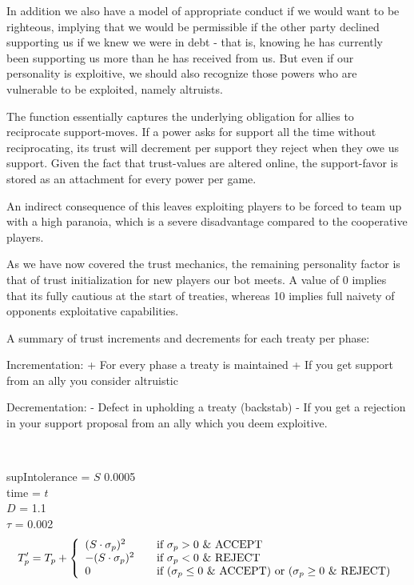 \documentclass[a4paper]{article} %
\begin{document}
 In addition we also have a model of appropriate conduct if we would want to be righteous, implying that we would be permissible if the other party declined supporting us if we knew we were in debt - that is, knowing he has currently been supporting us more than he has received from us. But even if our personality is exploitive, we should also recognize those powers who are vulnerable to be exploited, namely altruists.

The function essentially captures the underlying obligation for allies to reciprocate support-moves. If a power asks for support all the time without reciprocating, its trust will decrement per support they reject when they owe us support. Given the fact that trust-values are altered online, the support-favor is stored as an attachment for every power per game.

An indirect consequence of this leaves exploiting players to be forced to team up with a high paranoia, which is a severe disadvantage compared to the cooperative players.

As we have now covered the trust mechanics, the remaining personality factor is that of trust initialization for new players our bot meets. A value of 0 implies that its fully cautious at the start of treaties, whereas 10 implies full naivety of opponents exploitative capabilities. 

A summary of trust increments and decrements for each treaty per phase:

Incrementation:
+ For every phase a treaty is maintained 
+ If you get support from an ally you consider altruistic

Decrementation: 
- Defect in upholding a treaty (backstab)
- If you get a rejection in your support proposal from an ally which you deem exploitive.


\
\


supIntolerance = $S$ 0.0005\\
time = $t$ \\
$D$ = 1.1 \\
$\tau$ = 0.002\\




  \[ T'_p = T_p + \left\{ 
  \begin{array}{l l}
    (S \cdot \sigma_p)^2 & \quad \text{if $\sigma_p > 0$ \& ACCEPT}\\
    -(S \cdot \sigma_p)^2 & \quad \text{if $\sigma_p < 0$ \& REJECT}\\
    \text{0} & \quad \text{if ($\sigma_p \le 0$ \& ACCEPT) or ($\sigma_p \geq 0$ \& REJECT)}
    
  \end{array} \right.\]
  \\
  
\end{document}
